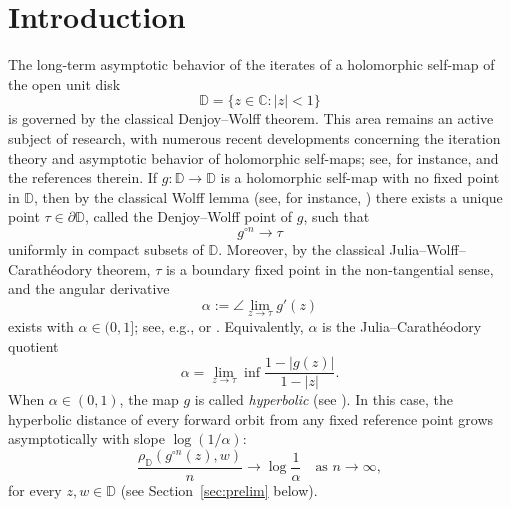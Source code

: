 \documentclass[12pt]{amsart}
\numberwithin{equation}{section}
\theoremstyle{plain}
\theoremstyle{definition}
\begin{document}
\tableofcontents
\section{Introduction}
\label{sec:intro}

The long-term asymptotic behavior of the iterates of a holomorphic self-map
of the open unit disk
\begin{equation*}
\mathbb D=\{z\in\mathbb C:|z|<1\}
\end{equation*}
is governed by the classical Denjoy--Wolff theorem. This area remains an
active subject of research, with numerous recent developments concerning the iteration theory and asymptotic behavior of holomorphic self-maps; see,
for instance, \cite{Abate, Bak-Pom, bracci2020, Bracci2010, Cowen81,  CDG2025parabolic, CDG2024, Mac, Pom79, Shoikhet} and the references therein. If
$g:\mathbb D\to\mathbb D$ is a holomorphic self-map with no fixed point in
$\mathbb D$, then by the classical Wolff lemma (see, for instance,
\cite{Abate}) there exists a unique point
$\tau\in\partial\mathbb D$, called the Denjoy--Wolff point of $g$, such
that
\begin{equation*}
g^{\circ n}\longrightarrow\tau
\end{equation*}
uniformly in compact subsets of $\mathbb D$. Moreover, by the classical
Julia--Wolff--Carath\'eodory theorem, $\tau$ is a boundary fixed point in
the non-tangential sense, and the angular derivative
\begin{equation*}
\alpha
:=
\angle\lim_{z\to\tau}g'(z)
\end{equation*}
exists with $\alpha\in(0,1]$; see, e.g.,
\cite[Theorem~1.8.4]{bracci2020} or \cite[p.~78]{Shapiro}. Equivalently,
$\alpha$ is the Julia--Carath\'eodory quotient
\begin{equation*}
\alpha
=
\lim_{z\to\tau}\inf
\frac{1-|g(z)|}{1-|z|}.
\end{equation*}
When $\alpha\in(0,1)$, the map $g$ is called \textit{hyperbolic}
(see \cite[Definition~1.8.5]{bracci2020}). In this case, the hyperbolic
distance of every forward orbit from any fixed reference point grows
asymptotically with slope $\log(1/\alpha)$:
\begin{equation*}
\frac{\rho_{\mathbb D}(g^{\circ n}(z),w)}{n}
\longrightarrow
\log\frac1\alpha
\quad\text{as }n\to\infty,
\end{equation*}
for every $z,w\in\mathbb D$ (see Section~\ref{sec:prelim} below).
\end{document}
